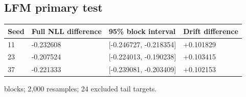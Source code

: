 \documentclass[conference]{IEEEtran}
\begin{document}
\subsection*{LFM primary test}
{\scriptsize\setlength{\tabcolsep}{2pt}
\noindent\begin{tabular}{@{}p{}p{}p{}p{}@{}}\toprule
Seed & Full NLL difference & 95\% block interval & Drift difference \\\midrule
11 & -0.232608 & [-0.246727, -0.218354] & +0.101829 \\
23 & -0.207524 & [-0.224013, -0.190238] & +0.103415 \\
37 & -0.221333 & [-0.239081, -0.203409] & +0.102153 \\
\bottomrule\end{tabular}}\par{} blocks; 2,000 resamples; 24 excluded tail targets.\par
\end{document}
